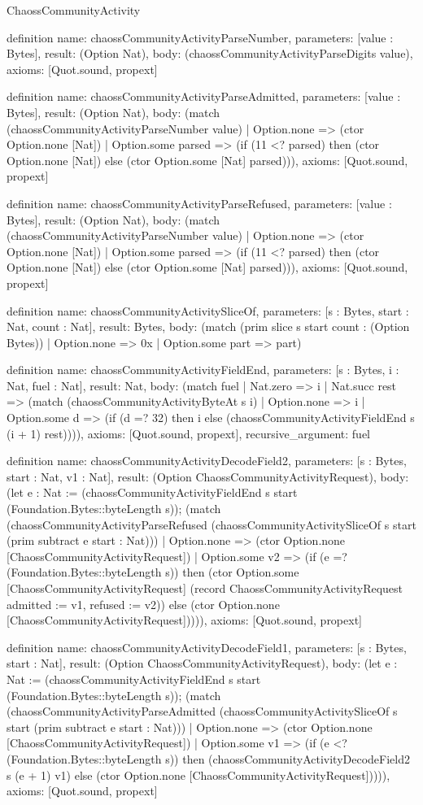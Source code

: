 \begin{lexlean}{ChaossCommunityActivity}
\begin{semanticmodule}
definition{
  name: chaossCommunityActivityParseNumber,
  parameters: [value : Bytes],
  result: (Option Nat),
  body: (chaossCommunityActivityParseDigits value),
  axioms: [Quot.sound, propext]
}

definition{
  name: chaossCommunityActivityParseAdmitted,
  parameters: [value : Bytes],
  result: (Option Nat),
  body: (match (chaossCommunityActivityParseNumber value)
    | Option.none => (ctor Option.none [Nat])
    | Option.some parsed => (if (11 <? parsed) then (ctor Option.none [Nat]) else (ctor Option.some [Nat] parsed))),
  axioms: [Quot.sound, propext]
}

definition{
  name: chaossCommunityActivityParseRefused,
  parameters: [value : Bytes],
  result: (Option Nat),
  body: (match (chaossCommunityActivityParseNumber value)
    | Option.none => (ctor Option.none [Nat])
    | Option.some parsed => (if (11 <? parsed) then (ctor Option.none [Nat]) else (ctor Option.some [Nat] parsed))),
  axioms: [Quot.sound, propext]
}

definition{
  name: chaossCommunityActivitySliceOf,
  parameters: [s : Bytes, start : Nat, count : Nat],
  result: Bytes,
  body: (match (prim slice s start count : (Option Bytes))
    | Option.none => 0x
    | Option.some part => part)
}

definition{
  name: chaossCommunityActivityFieldEnd,
  parameters: [s : Bytes, i : Nat, fuel : Nat],
  result: Nat,
  body: (match fuel
    | Nat.zero => i
    | Nat.succ rest => (match (chaossCommunityActivityByteAt s i)
      | Option.none => i
      | Option.some d => (if (d =? 32) then i else (chaossCommunityActivityFieldEnd s (i + 1) rest)))),
  axioms: [Quot.sound, propext],
  recursive_argument: fuel
}

definition{
  name: chaossCommunityActivityDecodeField2,
  parameters: [s : Bytes, start : Nat, v1 : Nat],
  result: (Option ChaossCommunityActivityRequest),
  body: (let e : Nat := (chaossCommunityActivityFieldEnd s start (Foundation.Bytes::byteLength s)); (match (chaossCommunityActivityParseRefused (chaossCommunityActivitySliceOf s start (prim subtract e start : Nat)))
    | Option.none => (ctor Option.none [ChaossCommunityActivityRequest])
    | Option.some v2 => (if (e =? (Foundation.Bytes::byteLength s)) then (ctor Option.some [ChaossCommunityActivityRequest] (record ChaossCommunityActivityRequest {admitted := v1, refused := v2})) else (ctor Option.none [ChaossCommunityActivityRequest])))),
  axioms: [Quot.sound, propext]
}

definition{
  name: chaossCommunityActivityDecodeField1,
  parameters: [s : Bytes, start : Nat],
  result: (Option ChaossCommunityActivityRequest),
  body: (let e : Nat := (chaossCommunityActivityFieldEnd s start (Foundation.Bytes::byteLength s)); (match (chaossCommunityActivityParseAdmitted (chaossCommunityActivitySliceOf s start (prim subtract e start : Nat)))
    | Option.none => (ctor Option.none [ChaossCommunityActivityRequest])
    | Option.some v1 => (if (e <? (Foundation.Bytes::byteLength s)) then (chaossCommunityActivityDecodeField2 s (e + 1) v1) else (ctor Option.none [ChaossCommunityActivityRequest])))),
  axioms: [Quot.sound, propext]
}


\end{semanticmodule}
\end{lexlean}
